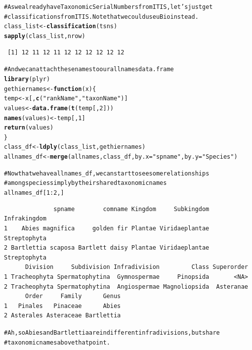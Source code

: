 \documentclass[letterpaper,superscriptaddress,showkeys,longbibliography,10pt]{revtex4-1}\usepackage{graphicx, color}
\makeatletter
\newcommand{\hlfunctioncall}[1]{\textcolor[rgb]{0.501960784313725,0,0.329411764705882}{\textbf{#1}}}%
\newcommand{\hlstring}[1]{\textcolor[rgb]{0.6,0.6,1}{#1}}%
\newcommand{\hlcomment}[1]{\textcolor[rgb]{0.180392156862745,0.6,0.341176470588235}{#1}}%
\newenvironment{kframe}{%
 \def\at@end@of@kframe{}%
 \ifinner\ifhmode%
  \def\at@end@of@kframe{\end{minipage}}%
  \begin{minipage}{\columnwidth}%
 \fi\fi%
 \def\FrameCommand##1{\hskip\@totalleftmargin \hskip-\fboxsep
 \colorbox{shadecolor}{##1}\hskip-\fboxsep
     \hskip-\linewidth \hskip-\@totalleftmargin \hskip\columnwidth}%
 \MakeFramed {\advance\hsize-\width
   \@totalleftmargin\z@ \linewidth\hsize
   \@setminipage}}%
 {\par\unskip\endMakeFramed%
 \at@end@of@kframe}
\newenvironment{knitrout}{}{} %
\makeatother
\begin{document}
\begin{appendices}
\begin{knitrout}
\color{fgcolor}\begin{kframe}
\begin{alltt}
\hlcomment{# As we already have Taxonomic Serial Numbers from ITIS, let's just get}
\hlcomment{# classifications from ITIS. Note that we could use uBio instead.}
class_list <- \hlfunctioncall{classification}(tsns)
\hlfunctioncall{sapply}(class_list, nrow)
\end{alltt}
\begin{verbatim}
 [1] 12 11 12 11 12 12 12 12 12 12
\end{verbatim}
\begin{alltt}

\hlcomment{# And we can attach these names to our allnames data.frame}
\hlfunctioncall{library}(plyr)
gethiernames <- \hlfunctioncall{function}(x) \{
    temp <- x[, \hlfunctioncall{c}(\hlstring{"rankName"}, \hlstring{"taxonName"})]
    values <- \hlfunctioncall{data.frame}(\hlfunctioncall{t}(temp[, 2]))
    \hlfunctioncall{names}(values) <- temp[, 1]
    \hlfunctioncall{return}(values)
\}
class_df <- \hlfunctioncall{ldply}(class_list, gethiernames)
allnames_df <- \hlfunctioncall{merge}(allnames, class_df, by.x = \hlstring{"spname"}, by.y = \hlstring{"Species"})

\hlcomment{# Now that we have allnames_df, we can start to see some relationships}
\hlcomment{# among species simply by their shared taxonomic names}
allnames_df[1:2, ]
\end{alltt}
\begin{verbatim}
              spname        comname Kingdom     Subkingdom Infrakingdom
1    Abies magnifica     golden fir Plantae Viridaeplantae Streptophyta
2 Bartlettia scaposa Bartlett daisy Plantae Viridaeplantae Streptophyta
      Division     Subdivision Infradivision         Class Superorder
1 Tracheophyta Spermatophytina  Gymnospermae     Pinopsida       <NA>
2 Tracheophyta Spermatophytina  Angiospermae Magnoliopsida  Asteranae
      Order     Family      Genus
1   Pinales   Pinaceae      Abies
2 Asterales Asteraceae Bartlettia
\end{verbatim}
\begin{alltt}

\hlcomment{# Ah, so Abies and Bartlettia are in different infradivisions, but share}
\hlcomment{# taxonomic names above that point.}
\end{alltt}
\end{kframe}
\end{knitrout}



\end{appendices}
\end{document}
